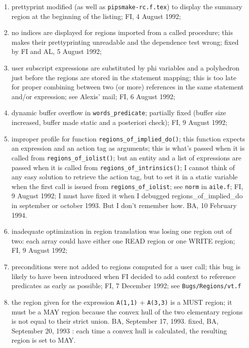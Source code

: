 \begin{enumerate}
  \item prettyprint modified (as well as \verb+pipsmake-rc.f.tex+) 
	to display the summary region at the beginning of the listing;
	FI, 4 August 1992;

  \item no indices are displayed for regions imported from a called
	procedure; this makes their prettyprinting unreadable and
	the dependence test wrong; fixed by FI and AL, 5 August 1992;

  \item user subscript expressions are substituted by phi variables
	and a polyhedron just before the regions are stored in the
	statement mapping; this is too late for proper combining
	between two (or more) references in the same statement and/or
	expression; see Alexis' mail; FI, 6 August 1992;

  \item dynamic buffer overflow in \verb+words_predicate+; partially
	fixed (buffer size increased, buffer made static and a
	posteriori check); FI, 9 August 1992;

  \item improper profile for function \verb+regions_of_implied_do()+;
	this function expects an expression and an action tag as
	arguments; this is what's passed when it is called from
	\verb+regions_of_iolist()+; but an entity and a list of
	expressions are passed when it is called from 
	\verb+regions_of_intrinsics()+; I cannot think of any easy
	solution to retrieve the action tag, but to set it in a static
	variable when the first call is issued from \verb+regions_of_iolist+;
	see \verb+norm+ in \verb+aile.f+; FI, 9 August 1992;
	I must have fixed it when I debugged regions_of_implied_do in
	september or october 1993. But I don't remember how. 
	BA, 10 February 1994.

  \item inadequate optimization in region translation was losing one
	region out of two: each array could have either one READ region
	or one WRITE region; FI, 9 August 1992;

  \item preconditions were not added to regions computed for a user
	call; this bug is likely to have been introduced when FI
	decided to add context to reference predicates as early
	as possible; FI, 7 December 1992; see \verb+Bugs/Regions/vt.f+

  \item the region given for the expression 
		\verb+A(1,1)+ + \verb+A(3,3)+ 
	is a MUST region; it must be a MAY region because the convex
	hull of the two elementary regions is not equal to their strict
	union. BA, September 17, 1993.
	fixed, BA, September 20, 1993 : each time a convex hull is
	calculated, the resulting region is set to MAY. 


\end{enumerate}
